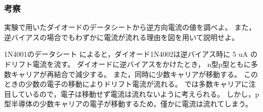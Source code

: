 \subsubsection{考察}
  実験で用いたダイオードのデータシートから逆方向電流の値を調べよ。
  また，逆バイアスの場合でもわずかに電流が流れる理由を図を用いて説明せよ。

  1N4001のデータシート\cite{web:1N4001} によると，ダイオード1N4002は逆バイアス時に 5 uA のドリフト電流を流す。
  ダイオードに逆バイアスをかけたとき，  n型p型ともに多数キャリアが再結合で減少する。
  また，同時に少数キャリアが移動する。
  このときの少数の電子の移動によりドリフト電流が流れる。
   では多数キャリアに注目しているので，電子は移動せず電流は流れないように考えられる。
  しかし，p型半導体の少数キャリアの電子が移動するため，僅かに電流は流れてしまう。
